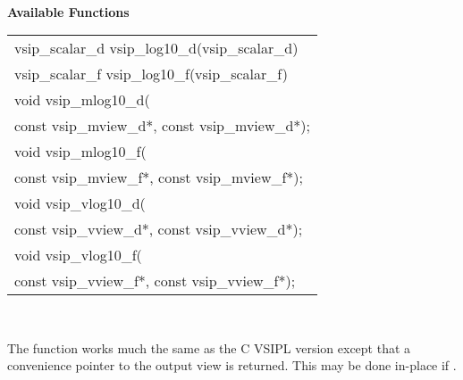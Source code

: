 \\\cvsiplh
\newline \hspace*{.8cm} \vspace*{.1cm} \textbf{Available Functions }
\newline \hspace*{1.1cm} {
\ttfamily
\begin{tabular}[H]{l}
vsip\_scalar\_d vsip\_log10\_d(vsip\_scalar\_d)\\
vsip\_scalar\_f vsip\_log10\_f(vsip\_scalar\_f)\\
void vsip\_mlog10\_d(\\*\hspace{1cm}const vsip\_mview\_d*, const vsip\_mview\_d*);\\
void vsip\_mlog10\_f(\\*\hspace{1cm}const vsip\_mview\_f*, const vsip\_mview\_f*);\\
void vsip\_vlog10\_d(\\*\hspace{1cm}const vsip\_vview\_d*, const vsip\_vview\_d*);\\
void vsip\_vlog10\_f(\\*\hspace{1cm}const vsip\_vview\_f*, const vsip\_vview\_f*);\\
\end{tabular}
}
\\\pyjvsiph
{}
\newline\hspace*{1.2cm}\parbox{10.8cm}{\vspace*{.1cm}The  function works much the same as the C VSIPL version except that a convenience pointer to the output view is returned. This may be done in-place if .}
